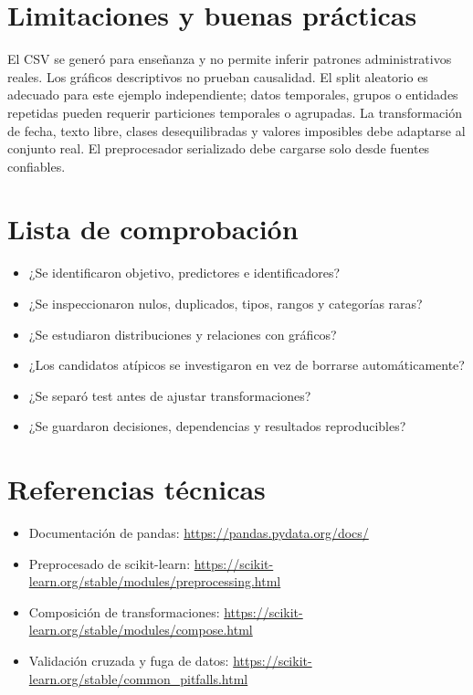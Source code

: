 \documentclass[11pt,a4paper]{article}
\begin{document}
\section{Limitaciones y buenas prácticas}
El CSV se generó para enseñanza y no permite inferir patrones administrativos reales. Los gráficos descriptivos no prueban causalidad. El split aleatorio es adecuado para este ejemplo independiente; datos temporales, grupos o entidades repetidas pueden requerir particiones temporales o agrupadas. La transformación de fecha, texto libre, clases desequilibradas y valores imposibles debe adaptarse al conjunto real. El preprocesador serializado debe cargarse solo desde fuentes confiables.
\section{Lista de comprobación}
\begin{itemize}[nosep]
\item[$\square$] ¿Se identificaron objetivo, predictores e identificadores?
\item[$\square$] ¿Se inspeccionaron nulos, duplicados, tipos, rangos y categorías raras?
\item[$\square$] ¿Se estudiaron distribuciones y relaciones con gráficos?
\item[$\square$] ¿Los candidatos atípicos se investigaron en vez de borrarse automáticamente?
\item[$\square$] ¿Se separó test antes de ajustar transformaciones?
\item[$\square$] ¿Se guardaron decisiones, dependencias y resultados reproducibles?
\end{itemize}
\section{Referencias técnicas}
\begin{itemize}
\item Documentación de pandas: \url{https://pandas.pydata.org/docs/}
\item Preprocesado de scikit-learn: \url{https://scikit-learn.org/stable/modules/preprocessing.html}
\item Composición de transformaciones: \url{https://scikit-learn.org/stable/modules/compose.html}
\item Validación cruzada y fuga de datos: \url{https://scikit-learn.org/stable/common_pitfalls.html}
\end{itemize}
\end{document}
